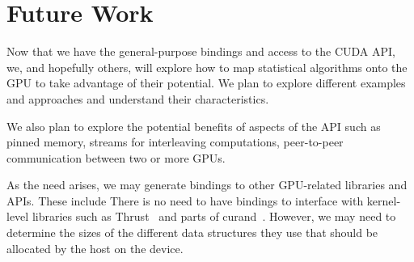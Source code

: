 \documentclass[article]{jss}
\def\R{\proglang{R}}
\begin{document}
\section{Future Work}

Now that we have the general-purpose bindings and access to the CUDA
API, we, and hopefully others, will explore how to map statistical
algorithms onto the GPU to take advantage of their potential.  We plan
to explore different examples and approaches and understand their
characteristics.  

We also plan to explore the potential benefits of aspects of the API
such as pinned memory, streams for interleaving computations,
peer-to-peer communication between two or more GPUs.

As the need arises, we may generate bindings to other GPU-related
libraries and APIs. These include There is no need to have \R{}
bindings to interface with kernel-level libraries such as
Thrust~\cite{bib:Thrust} and parts of curand~\cite{bib:curand}.
However, we may need to determine the sizes of the different data
structures they use that should be allocated by the host on the
device.



\end{document}
